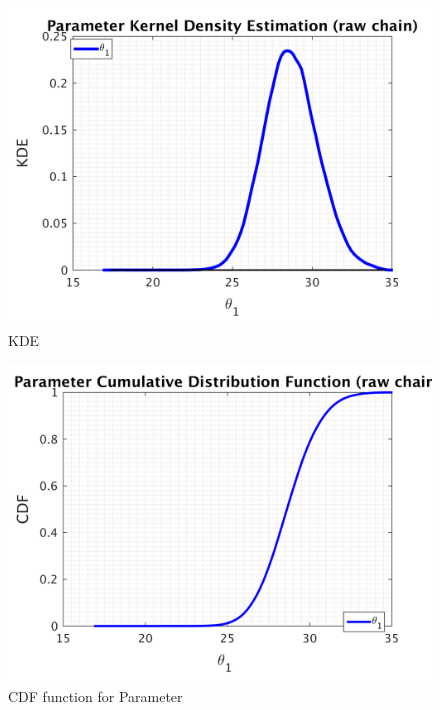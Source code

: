 \begin{figure}[H]
  
  \centering
   \includegraphics[scale=0.75]{53_results/output_300000/simple_ip_kde_raw}
   \caption{ KDE }
\end{figure}

\begin{figure}[H]
  
  \centering
   \includegraphics[scale=0.75]{53_results/output_300000/simple_ip_cdf_raw}
   \caption{CDF function for Parameter }
\end{figure}




